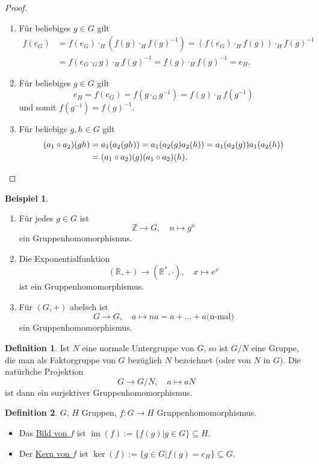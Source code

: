 \documentclass[12pt]{scrartcl} %
\DeclareMathOperator{\im}{im}
\theoremstyle{definition}
\newtheorem*{defn}{Definition}
\newtheorem{ex}{Beispiel}
\theoremstyle{remark}
\newcommand{\defi}{\underline}
\begin{document}
\begin{proof}
	\begin{enumerate}
	\item Für beliebiges \(g \in G\) gilt
		\begin{align*}
			f(e_G) &= f(e_G)\cdot_H(f(g)\cdot_Hf(g)^{-1}) = (f(e_G)\cdot_Hf(g))\cdot_Hf(g)^{-1}\\
			&= f(e_G\cdot_Gg)\cdot_Hf(g)^{-1} = f(g)\cdot_Hf(g)^{-1} = e_H.
		\end{align*}
	\item Für beliebiges \(g \in G\) gilt \[e_H=f(e_G)=f(g\cdot_G g^{-1})=f(g)\cdot_{H}f(g^{-1})\] und somit \(f(g^{-1})=f(g)^{-1}\).
	\item Für beliebige \(g, h \in G\) gilt
		\begin{align*}
			(a_1\circ a_2)(gh) &= a_1(a_2(gh)) = a_1(a_2(g)a_2(h)) = a_1(a_2(g))a_1(a_2(h))\\
			&= (a_1\circ a_2)(g)(a_1\circ a_2)(h).\qedhere
		\end{align*}
	\end{enumerate}
\end{proof}

\begin{ex}
	\begin{enumerate}
	\item Für jedes $g \in G$ ist
		$$\mathbb{Z} \rightarrow G, \quad n \mapsto g^n$$
		ein Gruppenhomomorphismus.
	\item Die Exponentialfunktion
		$$(\mathbb{R},+)\rightarrow(\mathbb{R}^*,\cdot), \quad x\mapsto e^x$$
		ist ein Gruppenhomomorphismus.
	\item Für $(G,+)$ abelsch ist
		$$G\rightarrow G, \quad a\mapsto na = a+...+a \text{(n-mal)}$$
		ein Gruppenhomomorphismus.
	\end{enumerate}
\end{ex}

\begin{defn}
	Ist $N$ eine normale Untergruppe von $G$, so ist $G/N$ eine Gruppe, die man als Faktorgruppe von $G$ bezüglich $N$ bezeichnet (oder von $N$ in $G$).
	Die natürliche Projektion $$G\rightarrow G/N, \quad a\mapsto aN$$ ist dann ein surjektiver Gruppenhomomorphismus.
\end{defn}

\begin{defn}
	$G$, $H$ Gruppen, $f: G \rightarrow H$ Gruppenhomomorphismus.
	\begin{itemize}
	\item Das \defi{Bild von $f$} ist $\im(f) := \{f(g) | g \in G\} \subseteq H$.
	\item Der \defi{Kern von $f$} ist $\ker(f) := \{g \in G | f(g) = e_H\} \subseteq G$.
	\end{itemize}
\end{defn}
\end{document}
